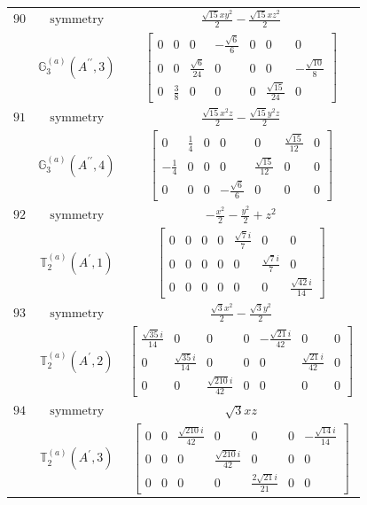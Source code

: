 \documentclass[fleqn,8pt,landscape]{jsarticle}
\begin{document}
\begin{longtable}{ccc}
$ 90 $ & $ \text{symmetry} $ & $ \frac{\sqrt{15} x y^{2}}{2} - \frac{\sqrt{15} x z^{2}}{2} $ \\
$  $ & $ \mathbb{G}_{3}^{(a)}(A^{\prime\prime},3) $ & $ \begin{bmatrix} 0 & 0 & 0 & - \frac{\sqrt{6}}{6} & 0 & 0 & 0 \\ 0 & 0 & \frac{\sqrt{6}}{24} & 0 & 0 & 0 & - \frac{\sqrt{10}}{8} \\ 0 & \frac{3}{8} & 0 & 0 & 0 & \frac{\sqrt{15}}{24} & 0 \end{bmatrix} $ \\ \hline
$ 91 $ & $ \text{symmetry} $ & $ \frac{\sqrt{15} x^{2} z}{2} - \frac{\sqrt{15} y^{2} z}{2} $ \\
$  $ & $ \mathbb{G}_{3}^{(a)}(A^{\prime\prime},4) $ & $ \begin{bmatrix} 0 & \frac{1}{4} & 0 & 0 & 0 & \frac{\sqrt{15}}{12} & 0 \\ - \frac{1}{4} & 0 & 0 & 0 & \frac{\sqrt{15}}{12} & 0 & 0 \\ 0 & 0 & 0 & - \frac{\sqrt{6}}{6} & 0 & 0 & 0 \end{bmatrix} $ \\ \hline
$ 92 $ & $ \text{symmetry} $ & $ - \frac{x^{2}}{2} - \frac{y^{2}}{2} + z^{2} $ \\
$  $ & $ \mathbb{T}_{2}^{(a)}(A^{\prime},1) $ & $ \begin{bmatrix} 0 & 0 & 0 & 0 & \frac{\sqrt{7} i}{7} & 0 & 0 \\ 0 & 0 & 0 & 0 & 0 & \frac{\sqrt{7} i}{7} & 0 \\ 0 & 0 & 0 & 0 & 0 & 0 & \frac{\sqrt{42} i}{14} \end{bmatrix} $ \\ \hline
$ 93 $ & $ \text{symmetry} $ & $ \frac{\sqrt{3} x^{2}}{2} - \frac{\sqrt{3} y^{2}}{2} $ \\
$  $ & $ \mathbb{T}_{2}^{(a)}(A^{\prime},2) $ & $ \begin{bmatrix} \frac{\sqrt{35} i}{14} & 0 & 0 & 0 & - \frac{\sqrt{21} i}{42} & 0 & 0 \\ 0 & \frac{\sqrt{35} i}{14} & 0 & 0 & 0 & \frac{\sqrt{21} i}{42} & 0 \\ 0 & 0 & \frac{\sqrt{210} i}{42} & 0 & 0 & 0 & 0 \end{bmatrix} $ \\ \hline
$ 94 $ & $ \text{symmetry} $ & $ \sqrt{3} x z $ \\
$  $ & $ \mathbb{T}_{2}^{(a)}(A^{\prime},3) $ & $ \begin{bmatrix} 0 & 0 & \frac{\sqrt{210} i}{42} & 0 & 0 & 0 & - \frac{\sqrt{14} i}{14} \\ 0 & 0 & 0 & \frac{\sqrt{210} i}{42} & 0 & 0 & 0 \\ 0 & 0 & 0 & 0 & \frac{2 \sqrt{21} i}{21} & 0 & 0 \end{bmatrix} $ \\ \hline

\end{longtable}
\end{document}
